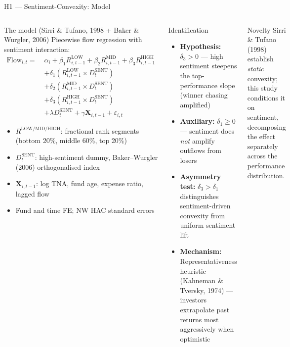 \documentclass[aspectratio=169,10pt]{beamer}
\begin{document}
\begin{frame}{H1 — Sentiment-Convexity: Model}
\begin{columns}[T]
\begin{block}{The model (Sirri \& Tufano, 1998 + Baker \& Wurgler, 2006)}
{\footnotesize Piecewise flow regression with sentiment interaction:}
{\footnotesize
\begin{align*}
\mathrm{Flow}_{i,t} = \;&\alpha_i + \beta_1 R^{\mathrm{LOW}}_{i,t-1} + \beta_2 R^{\mathrm{MID}}_{i,t-1} + \beta_3 R^{\mathrm{HIGH}}_{i,t-1} \\
&+ \delta_1 (R^{\mathrm{LOW}}_{i,t-1} \times D^{\mathrm{SENT}}_t) \\
&+ \delta_2 (R^{\mathrm{MID}}_{i,t-1} \times D^{\mathrm{SENT}}_t) \\
&+ \delta_3 (R^{\mathrm{HIGH}}_{i,t-1} \times D^{\mathrm{SENT}}_t) \\
&+ \lambda D^{\mathrm{SENT}}_t + \gamma \mathbf{X}_{i,t-1} + \varepsilon_{i,t}
\end{align*}}
{\footnotesize
\begin{itemize}
  \item $R^{\mathrm{LOW/MID/HIGH}}$: fractional rank segments (bottom 20\%, middle 60\%, top 20\%)
  \item $D^{\mathrm{SENT}}_t$: high-sentiment dummy, Baker--Wurgler (2006) orthogonalised index
  \item $\mathbf{X}_{i,t-1}$: log TNA, fund age, expense ratio, lagged flow
  \item Fund and time FE; NW HAC standard errors
\end{itemize}}
\end{block}

\begin{block}{Identification}
{\footnotesize
\begin{itemize}
  \item \textbf{Hypothesis:} $\delta_3 > 0$ — high sentiment steepens the top-performance slope (winner chasing amplified)
  \item \textbf{Auxiliary:} $\delta_1 \geq 0$ — sentiment does \emph{not} amplify outflows from losers
  \item \textbf{Asymmetry test:} $\delta_3 > \delta_1$ distinguishes sentiment-driven convexity from uniform sentiment lift
  \item \textbf{Mechanism:} Representativeness heuristic (Kahneman \& Tversky, 1974) — investors extrapolate past returns most aggressively when optimistic
\end{itemize}}
\end{block}

\begin{block}{Novelty}
{\footnotesize Sirri \& Tufano (1998) establish \emph{static} convexity; this study conditions it on sentiment, decomposing the effect separately across the performance distribution.}
\end{block}

\end{columns}
\end{frame}
\end{document}
